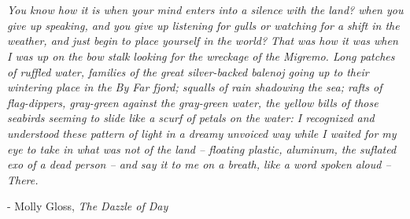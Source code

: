 \section{}

\textit{\noindent You know how it is when your mind enters into a silence with
the land? when you give up speaking, and you give up listening for gulls or
watching for a shift in the weather, and just begin to place yourself in the
world? That was how it was when I was up on the bow stalk looking for the
wreckage of the {\normalfont Migremo}. Long patches of ruffled water, families
of the great silver-backed balenoj going up to their wintering place in the By
Far fjord; squalls of rain shadowing the sea; rafts of flag-dippers, gray-green
against the gray-green water, the yellow bills of those seabirds seeming to
slide like a scurf of petals on the water: I recognized and understood these
pattern of light in a dreamy unvoiced way while I waited for my eye to take in
what was not of the land -- floating plastic, aluminum, the suflated exo of a
dead person -- and say it to me on a breath, like a word spoken aloud --
{\normalfont There}.
}

- Molly Gloss, \emph{The Dazzle of Day}
